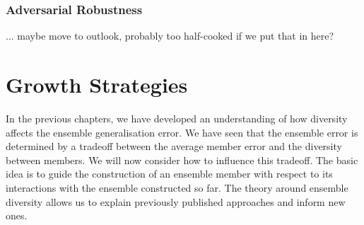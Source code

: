\documentclass[
    a4paper, %
	fontsize=10pt, %
	twoside=false, %
]{kaobook}
\begin{document}




\subsection{Adversarial Robustness}

... maybe move to outlook, probably too half-cooked if we put that in here?





\chapter{Growth Strategies}



In the previous chapters, we have developed an understanding of how diversity affects the ensemble generalisation error. We have seen that the ensemble error is determined by a tradeoff between the average member error and the diversity between members. We will now consider how to influence this tradeoff. The basic idea is to guide the construction of an ensemble member with respect to its interactions with the ensemble constructed so far.
The theory around ensemble diversity allows us to explain previously published approaches and inform new ones. 


\end{document}
